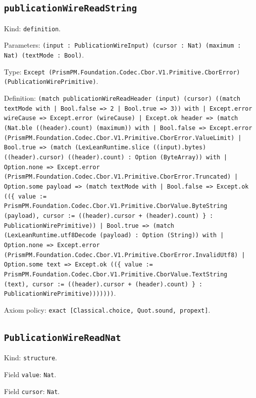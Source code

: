 \documentclass[11pt]{article}
\begin{document}
\subsection*{\texttt{publicationWireReadString}}
\noindent Kind: \texttt{definition}.\par
\noindent Parameters: \texttt{(input : PublicationWireInput) (cursor : Nat) (maximum : Nat) (textMode : Bool)}.\par
\noindent Type: \texttt{Except (PrismPM.Foundation.Codec.Cbor.V1.Primitive.CborError) (PublicationWirePrimitive)}.\par
\noindent Definition: \texttt{(match publicationWireReadHeader (input) (cursor) ((match textMode with | Bool.false => 2 | Bool.true => 3)) with | Except.error wireCause => Except.error (wireCause) | Except.ok header => (match (Nat.ble ((header).count) (maximum)) with | Bool.false => Except.error (PrismPM.Foundation.Codec.Cbor.V1.Primitive.CborError.ValueLimit) | Bool.true => (match (LexLeanRuntime.slice ((input).bytes) ((header).cursor) ((header).count) : Option (ByteArray)) with | Option.none => Except.error (PrismPM.Foundation.Codec.Cbor.V1.Primitive.CborError.Truncated) | Option.some payload => (match textMode with | Bool.false => Except.ok ((\{ value := PrismPM.Foundation.Codec.Cbor.V1.Primitive.CborValue.ByteString (payload), cursor := ((header).cursor + (header).count) \} : PublicationWirePrimitive)) | Bool.true => (match (LexLeanRuntime.utf8Decode (payload) : Option (String)) with | Option.none => Except.error (PrismPM.Foundation.Codec.Cbor.V1.Primitive.CborError.InvalidUtf8) | Option.some text => Except.ok ((\{ value := PrismPM.Foundation.Codec.Cbor.V1.Primitive.CborValue.TextString (text), cursor := ((header).cursor + (header).count) \} : PublicationWirePrimitive)))))))}.\par
\noindent Axiom policy: \texttt{exact [Classical.choice, Quot.sound, propext]}.\par
\subsection*{\texttt{PublicationWireReadNat}}
\noindent Kind: \texttt{structure}.\par
\noindent Field \texttt{value}: \texttt{Nat}.\par
\noindent Field \texttt{cursor}: \texttt{Nat}.\par
\end{document}
